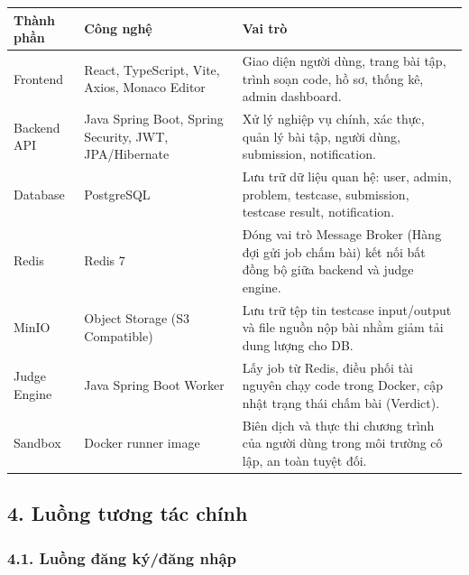 \documentclass[12pt,a4paper]{article}
\renewcommand{\_}{\BreakableUnderscore}
\begin{document}
\begin{longtable}[]{
  |>{\raggedright\arraybackslash}p{}
  |>{\raggedright\arraybackslash}p{}
  |>{\raggedright\arraybackslash}p{}|}
\hline\rowcolor{tableHeader}
\begin{minipage}[b]{\linewidth}\raggedright
Thành phần
\end{minipage} & \begin{minipage}[b]{\linewidth}\raggedright
Công nghệ
\end{minipage} & \begin{minipage}[b]{\linewidth}\raggedright
Vai trò
\end{minipage} \\
\hline
\endhead
\hline
\endlastfoot
Frontend & React, TypeScript, Vite, Axios, Monaco Editor & Giao diện người dùng, trang bài tập, trình soạn code, hồ sơ, thống kê, admin dashboard. \\
\hline
Backend API & Java Spring Boot, Spring Security, JWT, JPA/Hibernate & Xử lý nghiệp vụ chính, xác thực, quản lý bài tập, người dùng, submission, notification. \\
\hline
Database & PostgreSQL & Lưu trữ dữ liệu quan hệ: user, admin, problem, testcase, submission, testcase result, notification. \\
\hline
Redis & Redis 7 & Đóng vai trò Message Broker (Hàng đợi gửi job chấm bài) kết nối bất đồng bộ giữa backend và judge engine. \\
\hline
MinIO & Object Storage (S3 Compatible) & Lưu trữ tệp tin testcase input/output và file nguồn nộp bài nhằm giảm tải dung lượng cho DB. \\
\hline
Judge Engine & Java Spring Boot Worker & Lấy job từ Redis, điều phối tài nguyên chạy code trong Docker, cập nhật trạng thái chấm bài (Verdict). \\
\hline
Sandbox & Docker runner image & Biên dịch và thực thi chương trình của người dùng trong môi trường cô lập, an toàn tuyệt đối. \\
\hline
\end{longtable}

\subsection{4. Luồng tương tác chính}

\subsubsection{4.1. Luồng đăng ký/đăng nhập}
\end{document}
